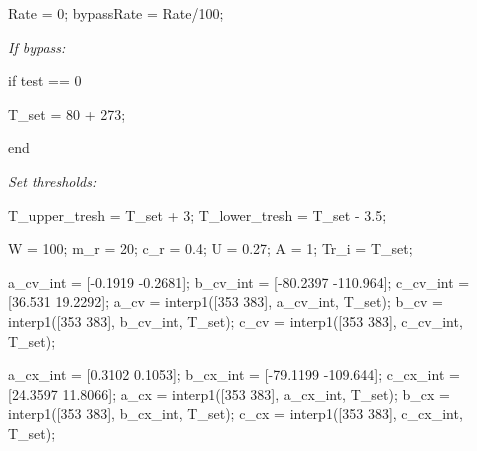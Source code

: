 \begin{matlabcode}
Rate = 0; %
bypassRate = Rate/100;     
\end{matlabcode}

\begin{par}
\begin{flushleft}
\textit{If bypass:}
\end{flushleft}
\end{par}

\begin{matlabcode}
\end{matlabcode}

\label{H_E80BE0AF}

\begin{matlabcode}
if test == 0
    
    T_set =    80 + 273; %
    
end
\end{matlabcode}

\begin{par}
\begin{flushleft}
\textit{Set thresholds:}
\end{flushleft}
\end{par}

\begin{matlabcode}
T_upper_tresh = T_set + 3;
T_lower_tresh = T_set - 3.5;
\end{matlabcode}

\label{H_A733F37E}

\begin{matlabcode}
W =      100; %
m_r =    20; %
c_r =    0.4; %
U =      0.27; %
A =      1; %
Tr_i =   T_set; %
\end{matlabcode}

\label{H_E6FB3D28}

\begin{par}
\hfill \break
\end{par}

\begin{matlabcode}
a_cv_int = [-0.1919 -0.2681];
b_cv_int = [-80.2397 -110.964];
c_cv_int = [36.531 19.2292];
a_cv = interp1([353 383], a_cv_int, T_set);
b_cv = interp1([353 383], b_cv_int, T_set);
c_cv = interp1([353 383], c_cv_int, T_set);

a_cx_int = [0.3102 0.1053];
b_cx_int = [-79.1199 -109.644];
c_cx_int = [24.3597 11.8066];
a_cx = interp1([353 383], a_cx_int, T_set);
b_cx = interp1([353 383], b_cx_int, T_set);
c_cx = interp1([353 383], c_cx_int, T_set);
\end{matlabcode}

